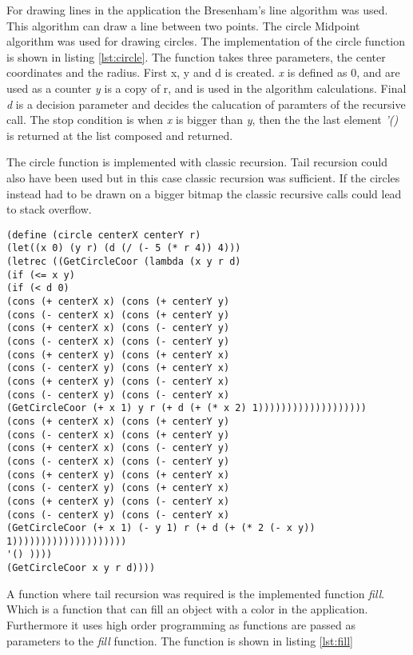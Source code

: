 For drawing lines in the application the Bresenham’s line algorithm was used. This algorithm can draw a line between two points. The circle Midpoint algorithm was used for drawing circles. The implementation of the circle function is shown in listing \ref{lst:circle}. The function takes three parameters, the center coordinates and the radius. First x, y and d is created. \emph{x} is defined as 0, and are used as a counter \emph{y} is a copy of r, and is used in the algorithm calculations. Final \emph{d} is  a decision parameter and decides the calucation of paramters of the recursive call. The stop condition is when \emph{x} is bigger than \emph{y}, then the the last element \emph{'()} is returned at the list composed and returned.

The circle function is implemented with classic recursion. Tail recursion could also have been used but in this case classic recursion was sufficient. If the circles instead had to be drawn on a bigger bitmap the classic recursive calls could lead to stack overflow.


\begin{lstlisting}[caption={Scheme function circle}, label=lst:circle]
(define (circle centerX centerY r)
(let((x 0) (y r) (d (/ (- 5 (* r 4)) 4)))
(letrec ((GetCircleCoor (lambda (x y r d)
(if (<= x y)
(if (< d 0)    
(cons (+ centerX x) (cons (+ centerY y)                                                
(cons (- centerX x) (cons (+ centerY y)
(cons (+ centerX x) (cons (- centerY y)         
(cons (- centerX x) (cons (- centerY y)
(cons (+ centerX y) (cons (+ centerY x)
(cons (- centerX y) (cons (+ centerY x)
(cons (+ centerX y) (cons (- centerY x)
(cons (- centerX y) (cons (- centerY x)  
(GetCircleCoor (+ x 1) y r (+ d (+ (* x 2) 1)))))))))))))))))))
(cons (+ centerX x) (cons (+ centerY y)                                                
(cons (- centerX x) (cons (+ centerY y)
(cons (+ centerX x) (cons (- centerY y)         
(cons (- centerX x) (cons (- centerY y)
(cons (+ centerX y) (cons (+ centerY x)
(cons (- centerX y) (cons (+ centerY x)
(cons (+ centerX y) (cons (- centerY x)
(cons (- centerX y) (cons (- centerY x)  
(GetCircleCoor (+ x 1) (- y 1) r (+ d (+ (* 2 (- x y)) 1))))))))))))))))))))
'() ))))
(GetCircleCoor x y r d))))   
\end{lstlisting}

A function where tail recursion was required is the implemented function \emph{fill}. Which is a function that can fill an object with a color in the application. Furthermore it uses high order programming as functions are passed as parameters to the \emph{fill} function. The function is shown in listing \ref{lst:fill}

